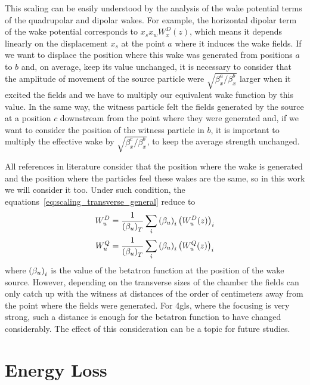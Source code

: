     This scaling can be easily understood by the analysis of the wake potential terms of the quadrupolar and dipolar wakes. For example, the horizontal dipolar term of the wake potential corresponds to $x_sx_wW_x^D(z)$, which means it depends linearly on the displacement $x_s$ at the point $a$ where it induces the wake fields. If we want to displace the position where this wake was generated from positions $a$ to $b$ and, on average, keep its value unchanged, it is necessary to consider that the amplitude of movement of the source particle were $\sqrt{\beta_x^a/\beta_x^b}$ larger when it excited the fields and we have to multiply our equivalent wake function by this value. In the same way, the witness particle felt the fields generated by the source at a position $c$ downstream from the point where they were generated and, if we want to consider the position of the witness particle in $b$, it is important to multiply the effective wake by $\sqrt{\beta_x^c/\beta_x^b}$, to keep the average strength unchanged.

    All references in literature consider that the position where the wake is generated and the position where the particles feel these wakes are the same, so in this work we will consider it too. Under such condition, the equations~\eqref{eq:scaling_transverse_general} reduce to
    \begin{align}\label{eq:scaling_transverse}\nonumber
        W_u^D &=\frac{1}{\left(\beta_u\right)_T} \sum_i \left(\beta_u\right)_i\left(W_u^D(z)\right)_i \\
        W_u^Q &=\frac{1}{\left(\beta_u\right)_T} \sum_i \left(\beta_u\right)_i\left(W_u^Q(z)\right)_i
    \end{align}
    where $\left(\beta_u\right)_i$ is the value of the betatron function at the position of the wake source. However,
    depending on the transverse sizes of the chamber the fields can only catch up with the witness at distances of the order of centimeters away from the point where the fields were generated. For \gls{4gls}, where the focusing is very strong, such a distance is enough for the betatron function to have changed considerably. The effect of this consideration can be a topic for future studies.

\section{Energy Loss}\label{sec:energy_loss}

